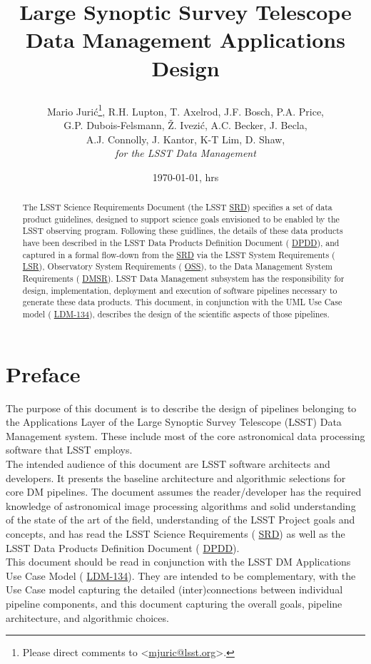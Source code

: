 \documentclass[12pt]{article}
\title{Large Synoptic Survey Telescope \\
Data Management Applications Design \\
{\author{
    Mario Juri\'c\footnote{Please direct comments to \textless\href{mailto:mjuric@lsst.org}{mjuric@lsst.org}\textgreater.},
    R.H. Lupton, T. Axelrod, J.F. Bosch, P.A. Price, \\
    G.P. Dubois-Felsmann, \v{Z}. Ivezi\'c, A.C. Becker, J. Becla,  \\ 
     A.J. Connolly, J. Kantor, K-T Lim, D. Shaw, \\
    {\em for the LSST Data Management}
}}}
\newcommand{\ds}[2]{{\color{blue} \href{https://docushare.lsstcorp.org/docushare/dsweb/Get/#1}{#2}}\xspace}
\newcommand{\SRD}{\ds{LPM-17}{SRD}}
\newcommand{\DPDD}{\ds{LSE-163}{DPDD}}
\newcommand{\LSR}{\ds{LSE-29}{LSR}}
\newcommand{\OSS}{\ds{LSE-30}{OSS}}
\newcommand{\DMSR}{\ds{LSE-61}{DMSR}}
\newcommand{\appsUML}{\ds{LDM-134}{LDM-134}}
\begin{document}
\date{\today, \currenttime hrs}
\maketitle
\pagestyle{headings}

\begin{abstract}
The LSST Science Requirements Document (the LSST \SRD) specifies a set of
data product guidelines, designed to support science goals envisioned to be enabled by the LSST observing program. Following these guidlines, the details of these data products have been described in the LSST Data Products Definition Document (\DPDD), and captured in a formal flow-down from the \SRD via the LSST System Requirements (\LSR), Observatory System Requirements (\OSS), to the Data Management System Requirements (\DMSR).
LSST Data Management subsystem has the responsibility for design, implementation, deployment and execution of software pipelines necessary to generate these data products. This document, in conjunction with the UML Use Case model (\appsUML), describes the design of the scientific aspects of those pipelines.
\end{abstract}

\clearpage

\tableofcontents

\clearpage

\section{Preface}

The purpose of this document is to describe the design of pipelines belonging to the Applications Layer of the Large Synoptic Survey Telescope (LSST) Data Management system. These include most of the core astronomical data processing software that LSST employs.
\\

The intended audience of this document are LSST software architects and developers. It presents the baseline architecture and algorithmic selections for core DM pipelines. The document assumes the reader/developer has the required knowledge of astronomical image processing algorithms and solid understanding of the state of the art of the field, understanding of the LSST Project goals and concepts, and has read the LSST Science Requirements (\SRD) as well as the LSST Data Products Definition Document (\DPDD).
\\

This document should be read in conjunction with the LSST DM Applications Use Case Model (\appsUML). They are intended to be complementary, with the Use Case model capturing the detailed (inter)connections between individual pipeline components, and this document capturing the overall goals, pipeline architecture, and algorithmic choices.
\\
\end{document}
